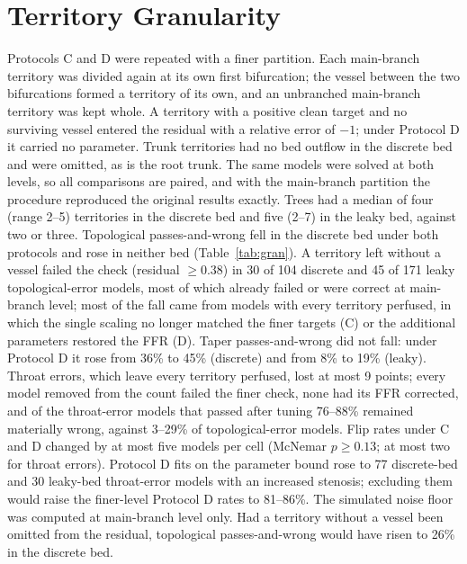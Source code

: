 \documentclass[journal,twoside,web,onecolumn]{ieeecolor}
\begin{document}
\section{Territory Granularity}\label{sec:granularity}
Protocols C and D were repeated with a finer partition. Each main-branch territory was divided again at its own first
bifurcation; the vessel between the two bifurcations formed a territory of its own, and an unbranched main-branch
territory was kept whole. A territory with a positive clean target and no surviving vessel entered the residual with a
relative error of $-1$; under Protocol D it carried no parameter. Trunk territories had no bed outflow in the discrete
bed and were omitted, as is the root trunk. The same models were solved at both levels, so all comparisons are paired,
and with the main-branch partition the procedure reproduced the original results exactly. Trees had a median of four
(range 2--5) territories in the discrete bed and five (2--7) in the leaky bed, against two or three. Topological
passes-and-wrong fell in the discrete bed under both protocols and rose in neither bed (Table~\ref{tab:gran}). A
territory left without a vessel failed the check (residual $\geq 0.38$) in 30 of 104 discrete and 45 of 171 leaky
topological-error models, most of which already failed or were correct at main-branch level; most of the fall came
from models with every territory perfused, in which the single scaling no longer matched the finer targets (C) or the
additional parameters restored the FFR (D). Taper passes-and-wrong did not fall: under Protocol D it rose from 36\% to
45\% (discrete) and from 8\% to 19\% (leaky). Throat errors, which leave every territory perfused, lost at most 9
points; every model removed from the count failed the finer check, none had its FFR corrected, and of the throat-error
models that passed after tuning 76--88\% remained materially wrong, against 3--29\% of topological-error models.
Flip rates under C and D changed by at most five models per cell (McNemar $p \geq 0.13$; at most two for throat
errors). Protocol D fits on the parameter bound rose to 77 discrete-bed and 30 leaky-bed throat-error models with an
increased stenosis; excluding them would raise the finer-level Protocol D rates to 81--86\%. The simulated noise floor
was computed at main-branch level only. Had a territory without a vessel been omitted from the residual, topological
passes-and-wrong would have risen to 26\% in the discrete bed.
\end{document}
